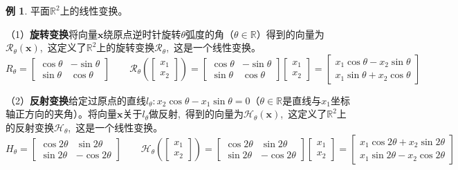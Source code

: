 \documentclass[10pt, a4paper, oneside, fontset=none]{ctexart}
\theoremstyle{plain}
\theoremstyle{definition}
\newtheorem{example}[theorem]{例}
\newcommand{\com}{,\,\,\,\:}
\newcommand{\R}{\mathbb{R}}
\newcommand{\tboba}[1]{\textbf{\kai\color{bali!75!black}#1}}
\begin{document}
\begin{pf}
\begin{example}
    平面$\R^2$上的线性变换。
    \renewcommand{\qedsymbol}{$\circledS$}

    （1）\tboba{旋转变换}\quad 将向量$\boldsymbol{x}$绕原点逆时针旋转$\theta$弧度的角（$\theta \in \R$）得到的向量为$\mathscr{R}_\theta(\boldsymbol{x})$\com 这定义了$\R^2$上的旋转变换$\mathscr{R}_\theta$\com 这是一个线性变换。
    $$R_\theta=\begin{bmatrix}
        \cos\theta&-\sin\theta \\ \sin\theta&\cos\theta
    \end{bmatrix}
    \quad\quad\mathscr{R}_\theta\left(\begin{bmatrix}
        x_1\\x_2
    \end{bmatrix}\right)=\begin{bmatrix}
        \cos\theta&-\sin\theta \\ \sin\theta&\cos\theta
    \end{bmatrix}\begin{bmatrix}
        x_1\\x_2
    \end{bmatrix}=\begin{bmatrix}
        x_1\cos\theta-x_2\sin\theta \\ x_1\sin\theta+x_2\cos\theta
    \end{bmatrix}$$

    （2）\tboba{反射变换}\quad 给定过原点的直线$l_\theta:x_2\cos\theta-x_1\sin\theta=0$（$\theta \in \R$是直线与$x_1$坐标轴正方向的夹角）。将向量$\boldsymbol{x}$关于$l_\theta$做反射\com 得到的向量为$\mathscr{H}_\theta(\boldsymbol{x})$\com 这定义了$\R^2$上的反射变换$\mathscr{H}_\theta$\com 这是一个线性变换。
    $$H_\theta=\begin{bmatrix}
        \cos2\theta&\sin2\theta \\ \sin2\theta&-\cos2\theta
    \end{bmatrix}
    \quad\quad \mathscr{H}_\theta\left(\begin{bmatrix}
        x_1\\x_2
    \end{bmatrix}\right)=\begin{bmatrix}
        \cos2\theta&\sin2\theta \\ \sin2\theta&-\cos2\theta
    \end{bmatrix}\begin{bmatrix}
        x_1\\x_2
    \end{bmatrix}=\begin{bmatrix}
        x_1\cos 2\theta+x_2\sin2\theta \\ x_1\sin2\theta-x_2\cos2\theta
    \end{bmatrix}$$


\end{example}
\end{pf}
\end{document}
